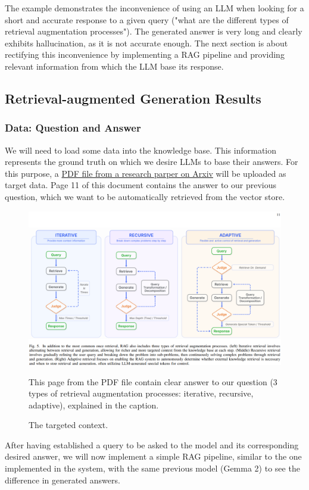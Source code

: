 The example demonstrates the inconvenience of using an LLM when looking for a short and accurate response to a given query ("what are the different types of retrieval augmentation processes"). The generated answer is very long and clearly exhibits hallucination, as it is not accurate enough.\newline
The next section is about rectifying this inconvenience by implementing a RAG pipeline and providing relevant information from which the LLM base its response.
\subsection{Retrieval-augmented Generation Results}
\subsubsection{Data: Question and Answer}
We will need to load some data into the knowledge base. This information represents the ground truth on which we desire LLMs to base their answers.\newline
For this purpose, a \href{https://arxiv.org/abs/2312.10997}{PDF file from a research parper on Arxiv} will be uploaded as target data. Page 11 of this document contains the answer to our previous question, which we want to be automatically retrieved from the vector store.
\begin{figure}[H]
    \centering
    \includegraphics[width=\linewidth]{./figures/toberetrieved.png}
    \caption{The targeted context.}
    \begin{flushleft}
        \small This page from the PDF file contain clear answer to our question (3 types of retrieval augmentation processes: iterative, recursive, adaptive), explained in the caption.
    \end{flushleft}
\end{figure}
After having established a query to be asked to the model and its corresponding desired answer, we will now implement a simple RAG pipeline, similar to the one implemented in the system, with the same previous model (Gemma 2) to see the difference in generated answers.

